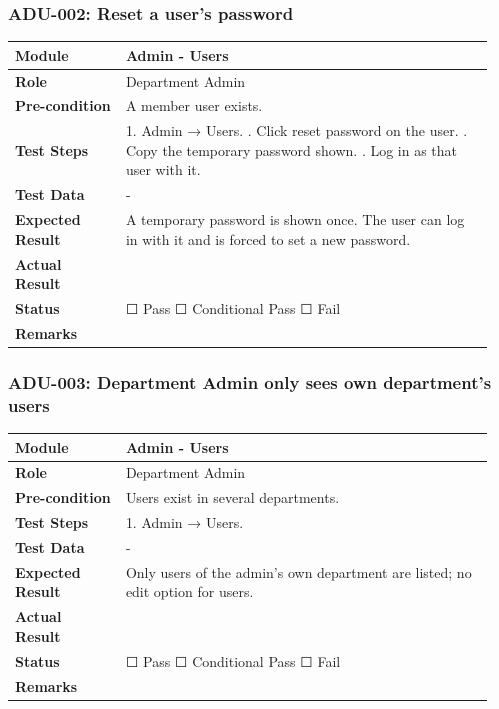 \documentclass[10pt]{article}
\begin{document}
\subsubsection*{ADU-002: Reset a user's password}
\begin{longtable}{p{0.22\linewidth}p{0.73\linewidth}}
\hline
\textbf{Module} & Admin - Users \\ \hline
\textbf{Role} & Department Admin \\ \hline
\textbf{Pre-condition} & A member user exists. \\ \hline
\textbf{Test Steps} & 1. Admin → Users. \newline 2. Click reset password on the user. \newline 3. Copy the temporary password shown. \newline 4. Log in as that user with it. \\ \hline
\textbf{Test Data} & - \\ \hline
\textbf{Expected Result} & A temporary password is shown once. The user can log in with it and is forced to set a new password. \\ \hline
\textbf{Actual Result} & \newline \newline \\ \hline
\textbf{Status} & ☐ Pass \quad ☐ Conditional Pass \quad ☐ Fail \\ \hline
\textbf{Remarks} & \newline \\ \hline
\end{longtable}
\subsubsection*{ADU-003: Department Admin only sees own department's users}
\begin{longtable}{p{0.22\linewidth}p{0.73\linewidth}}
\hline
\textbf{Module} & Admin - Users \\ \hline
\textbf{Role} & Department Admin \\ \hline
\textbf{Pre-condition} & Users exist in several departments. \\ \hline
\textbf{Test Steps} & 1. Admin → Users. \\ \hline
\textbf{Test Data} & - \\ \hline
\textbf{Expected Result} & Only users of the admin's own department are listed; no edit option for users. \\ \hline
\textbf{Actual Result} & \newline \newline \\ \hline
\textbf{Status} & ☐ Pass \quad ☐ Conditional Pass \quad ☐ Fail \\ \hline
\textbf{Remarks} & \newline \\ \hline
\end{longtable}
\end{document}
